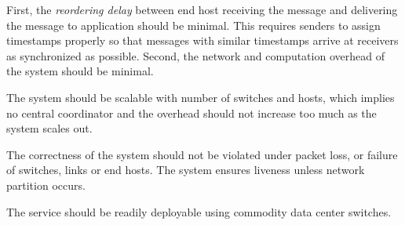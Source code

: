 First, the \textit{reordering delay} between end host receiving the message and delivering the message to application should be minimal.
This requires senders to assign timestamps properly so that messages with similar timestamps arrive at receivers as synchronized as possible.
Second, the network and computation overhead of the system should be minimal.

The system should be scalable with number of switches and hosts, which implies no central coordinator and the overhead should not increase too much as the system scales out.





The correctness of the system should not be violated under packet loss, or failure of switches, links or end hosts.
The system ensures liveness unless network partition occurs.


The service should be readily deployable using commodity data center switches.

